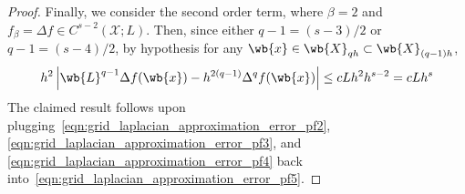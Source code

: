 \documentclass{article}
\newcommand{\abs}[1]{\left \lvert #1 \right \rvert}
\newcommand{\1}{\mathbf{1}}
\newcommand{\Xset}{\mathcal{X}}
\theoremstyle{alden}
\theoremstyle{aldenthm}
\theoremstyle{definition}
\theoremstyle{remark}
\begin{document}
\begin{proof}
	Finally, we consider the second order term, where $\beta = 2$ and $f_\beta = \Delta f \in C^{s - 2}(\Xset;L)$. Then, since either $q - 1 = (s - 3)/2$ or $q - 1 = (s - 4)/2$, by hypothesis for any $\wb{x} \in \wb{X}_{qh} \subset \wb{X}_{(q - 1)h} $,
	\begin{equation}
	\label{eqn:grid_laplacian_approximation_error_pf4}
	h^{2}\abs{ \wb{L}^{q - 1} \Delta f(\wb{x}) - h^{2(q - 1)} \Delta^{q} f(\wb{x})  } \leq cL h^{2}h^{s - 2} = cLh^s
	\end{equation}
The claimed result follows upon plugging~\eqref{eqn:grid_laplacian_approximation_error_pf2},\eqref{eqn:grid_laplacian_approximation_error_pf3}, and \eqref{eqn:grid_laplacian_approximation_error_pf4} back into~\eqref{eqn:grid_laplacian_approximation_error_pf5}.
\end{proof}
\end{document}
